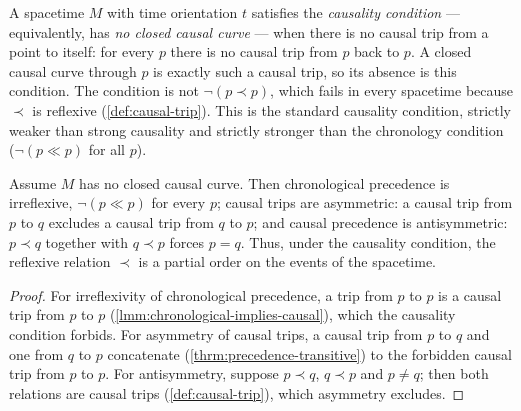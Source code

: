 \medskip

\begin{definition}
    \label{def:no-closed-causal-curve}
    \leanok
    A spacetime $M$ with time orientation $t$ satisfies the \emph{causality condition} --- equivalently, has \emph{no closed causal curve} --- when there is no causal trip from a point to itself: for every $p$ there is no causal trip from $p$ back to $p$. A closed causal curve through $p$ is exactly such a causal trip, so its absence is this condition. The condition is not $\lnot(p \prec p)$, which fails in every spacetime because $\prec$ is reflexive (\ref{def:causal-trip}). This is the standard causality condition, strictly weaker than strong causality and strictly stronger than the chronology condition ($\lnot(p \ll p)$ for all $p$).
\end{definition}

\medskip

\begin{theorem}
    \label{thrm:causal-order-refinements}
    \leanok
    Assume $M$ has no closed causal curve. Then chronological precedence is irreflexive, $\lnot(p \ll p)$ for every $p$; causal trips are asymmetric: a causal trip from $p$ to $q$ excludes a causal trip from $q$ to $p$; and causal precedence is antisymmetric: $p \prec q$ together with $q \prec p$ forces $p = q$. Thus, under the causality condition, the reflexive relation $\prec$ is a partial order on the events of the spacetime.
\end{theorem}
\begin{proof}
    \leanok
    For irreflexivity of chronological precedence, a trip from $p$ to $p$ is a causal trip from $p$ to $p$ (\ref{lmm:chronological-implies-causal}), which the causality condition forbids. For asymmetry of causal trips, a causal trip from $p$ to $q$ and one from $q$ to $p$ concatenate (\ref{thrm:precedence-transitive}) to the forbidden causal trip from $p$ to $p$. For antisymmetry, suppose $p \prec q$, $q \prec p$ and $p \neq q$; then both relations are causal trips (\ref{def:causal-trip}), which asymmetry excludes.
\end{proof}


